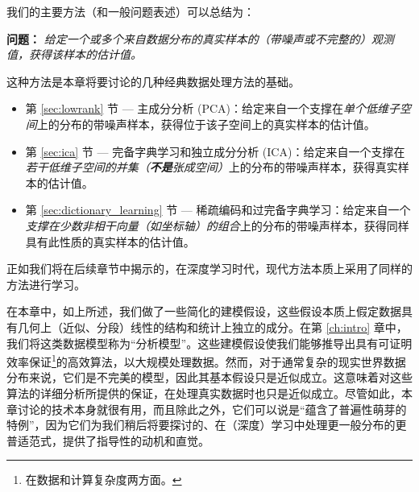 \documentclass[../../book-main_zh.tex]{subfiles}
\begin{document}
我们的主要方法（和一般问题表述）可以总结为：
\begin{tcolorbox}\centering
    \textbf{问题：} \textit{给定一个或多个来自数据分布的真实样本的（带噪声或不完整的）观测值，获得该样本的估计值。}
\end{tcolorbox}
这种方法是本章将要讨论的几种经典数据处理方法的基础。
\begin{itemize}
    \item 第 \ref{sec:lowrank} 节 --- 主成分分析 (PCA)：给定来自一个支撑在\textit{单个低维子空间}上的分布的带噪声样本，获得位于该子空间上的真实样本的估计值。
    \item 第 \ref{sec:ica} 节 --- 完备字典学习和独立成分分析 (ICA)：给定来自一个支撑在\textit{若干低维子空间的并集（\textbf{不是}张成空间）}上的分布的带噪声样本，获得真实样本的估计值。
    \item 第 \ref{sec:dictionary_learning} 节 --- 稀疏编码和过完备字典学习：给定来自一个\textit{支撑在少数非相干向量（如坐标轴）的组合}上的分布的带噪声样本，获得同样具有此性质的真实样本的估计值。
\end{itemize}
正如我们将在后续章节中揭示的，在深度学习时代，现代方法本质上采用了同样的方法进行学习。

在本章中，如上所述，我们做了一些简化的建模假设，这些假设本质上假定数据具有几何上（近似、分段）线性的结构和统计上独立的成分。在第 \ref{ch:intro} 章中，我们将这类数据模型称为“分析模型”。这些建模假设使我们能够推导出具有可证明效率保证\footnote{在数据和计算复杂度两方面。}的高效算法，以大规模处理数据。然而，对于通常复杂的现实世界数据分布来说，它们是不完美的模型，因此其基本假设只是近似成立。这意味着对这些算法的详细分析所提供的保证，在处理真实数据时也只是近似成立。尽管如此，本章讨论的技术本身就很有用，而且除此之外，它们可以说是“蕴含了普遍性萌芽的特例”，因为它们为我们稍后将要探讨的、在（深度）学习中处理更一般分布的更普适范式，提供了指导性的动机和直觉。%


\end{document}
